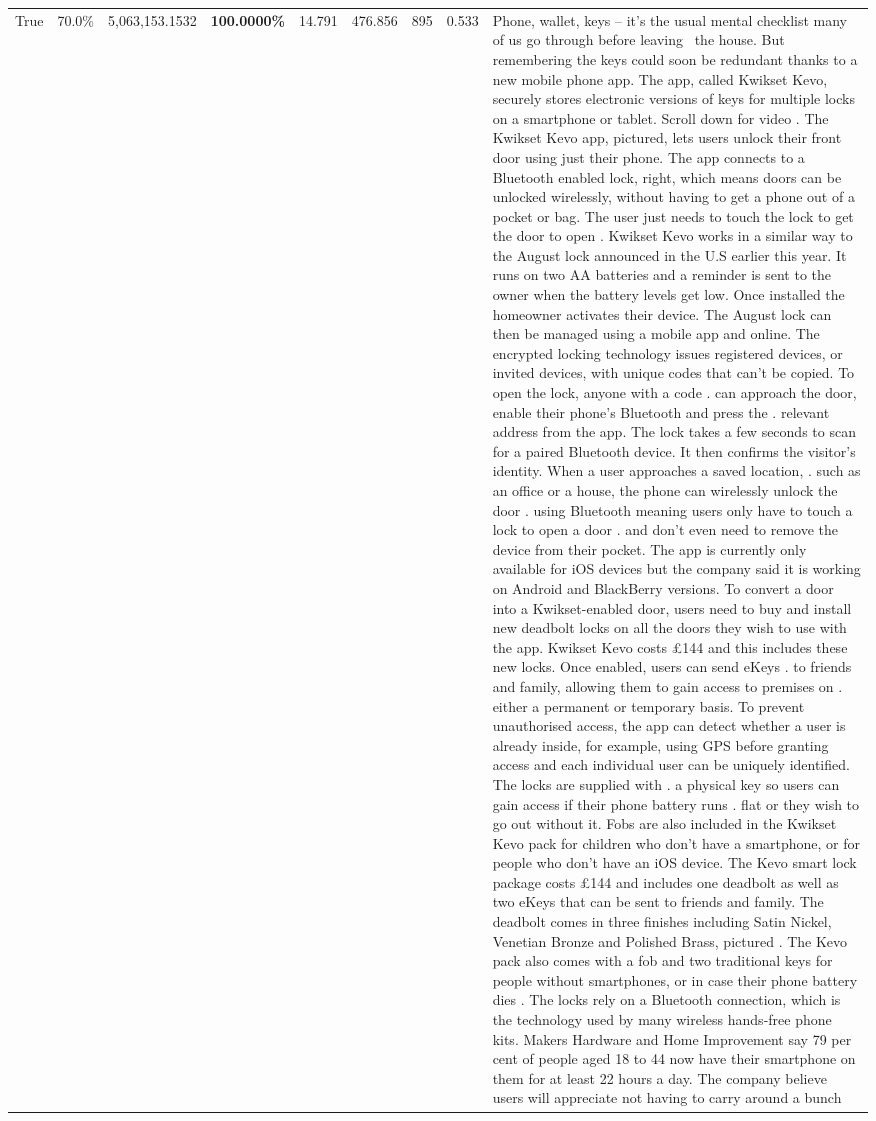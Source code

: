 \begin{table}[H]
\begin{tabular}{lllrlllll}
True & 70.0\% & 5,063,153.1532 & \bfseries \color{red} 100.0000\% & 14.791 & 476.856 & 895 & 0.533 & Phone, wallet, keys – it’s the usual mental checklist many of us go through before leaving  the house. But remembering the keys could soon be redundant thanks to a new mobile phone app. The app, called Kwikset Kevo, securely stores electronic versions of keys for multiple locks on a smartphone or tablet. Scroll down for video . The Kwikset Kevo app, pictured, lets users unlock their front door using just their phone. The app connects to a Bluetooth enabled lock, right, which means doors can be unlocked wirelessly, without having to get a phone out of a pocket or bag. The user just needs to touch the lock to get the door to open . Kwikset Kevo works in a similar way to the August lock announced in the U.S earlier this year. It runs on two AA batteries and a reminder is sent to the owner when the battery levels get low. Once installed the homeowner activates their device. The August lock can then be managed using a mobile app and online. The encrypted locking technology issues registered devices, or invited devices, with unique codes that can't be copied. To open the lock, anyone with a code . can approach the door, enable their phone's Bluetooth and press the . relevant address from the app. The lock takes a few seconds to scan for a paired Bluetooth device. It then confirms the visitor's identity. When a user approaches a saved location, . such as an office or a house, the phone can wirelessly unlock the door . using Bluetooth meaning users only have to touch a lock to open a door . and don't even need to remove the device from their pocket. The app is currently only available for iOS devices but the company said it is working on Android and BlackBerry versions. To convert a door into a Kwikset-enabled door, users need to buy and install new deadbolt locks on all the doors they wish to use with the app. Kwikset Kevo costs £144 and this includes these new locks. Once enabled, users can send eKeys . to friends and family, allowing them to gain access to premises on . either a permanent or temporary basis. To prevent unauthorised access, the app can detect whether a user is already inside, for example, using GPS before granting access and each individual user can be uniquely identified. The locks are supplied with . a physical key so users can gain access if their phone battery runs . flat or they wish to go out without it. Fobs are also included in the Kwikset Kevo pack for children who don't have a smartphone, or for people who don't have an iOS device. The Kevo smart lock package costs £144 and includes one deadbolt as well as two eKeys that can be sent to friends and family. The deadbolt comes in three finishes including Satin Nickel, Venetian Bronze and Polished Brass, pictured . The Kevo pack also comes with a fob and two traditional keys for people without smartphones, or in case their phone battery dies . The locks rely on a Bluetooth connection, which is the technology used by many wireless hands-free phone kits. Makers Hardware and Home Improvement say 79 per cent of people aged 18 to 44 now have their smartphone on them for at least 22 hours a day. The company believe users will appreciate not having to carry around a bunch 
\end{tabular}
\end{table}
